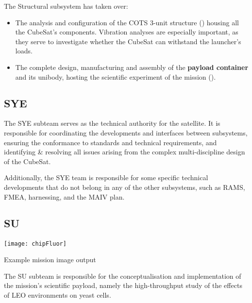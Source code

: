 \documentclass[a4paper,nobib]{tufte-book}
\begin{document}
The Structural subsystem has taken over:
\begin{itemize}
	\item The analysis and configuration of the \ac{COTS} 3-unit structure () housing all the CubeSat's components. Vibration analyses are especially important, as they serve to investigate whether the CubeSat can withstand the launcher's loads.
	\item The complete design, manufacturing and assembly of the \textbf{payload container} and its unibody, hosting the scientific experiment of the mission ().
\end{itemize}

\subsection{\acf{SYE}}

The \acl{SYE} subteam serves as the technical authority for the satellite. It is responsible for coordinating the developments and interfaces between subsystems, ensuring the conformance to standards and technical requirements, and identifying \& resolving all issues arising from the complex multi-discipline design of the CubeSat.

Additionally, the \ac{SYE} team is responsible for some specific technical developments that do not belong in any of the other subsystems, such as \ac{RAMS}, \ac{FMEA}, harnessing, and the \ac{MAIV} plan.

\subsection{\acf{SU}}
\label{sec:su}
\begin{marginfigure}
	\texttt{[image: chipFluor]}
	\caption[Example mission image output]{Example mission image output \parencite{DDJF_PL}}
	\label{fig:chip_fluor}
\end{marginfigure}

The \acl{SU} subteam is responsible for the conceptualisation and implementation of the mission's scientific payload, namely the high-throughput study of the effects of \ac{LEO} environments on yeast cells.
\end{document}
